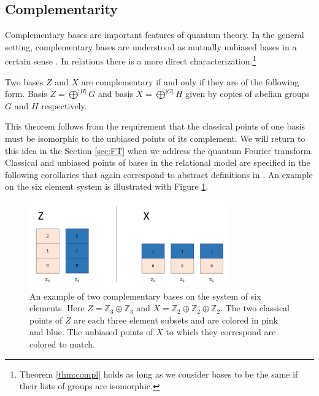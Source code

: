 \subsection{Complementarity}
Complementary bases are important features of quantum theory. In the general setting, complementary bases are understood as mutually unbiased bases in a certain sense \cite{InteractQOb}.  In relations there is a more direct characterization:\footnote{Theorem \ref{thm:compl} holds as long as we consider bases to be the same if their lists of groups are isomorphic.}
\begin{theorem}
\label{thm:compl}
Two bases $Z$ and $X$ are complementary if and only if they are of the following form. Basis $Z = \bigoplus^{|H|}G$ and basis $X = \bigoplus^{|G|}H$ given by copies of abelian groups $G$ and $H$ respectively.
\end{theorem}

This theorem follows from the requirement that the classical points of one basis must be isomorphic to the unbiased points of its complement. We will return to this idea in the Section \ref{sec:FT} when we address the quantum Fourier transform. Classical and unbiased points of bases in the relational model are specified in the following corollaries that again correspond to abstract definitions in \cite{InteractQOb}. An example on the six element system is illustrated with Figure \ref{complEx}.

\begin{figure}[tb]
\begin{center}
\includegraphics[height=10em,natwidth=1091,natheight=468,scale=1]{images/complexample.png}
\end{center}
\vspace{-14pt}
\caption{An example of two complementary bases on the system of six elements. Here $Z=\mathbb{Z}_3\oplus\mathbb{Z}_3$ and $X = \mathbb{Z}_2\oplus\mathbb{Z}_2\oplus \mathbb{Z}_2$.  The two classical points of $Z$ are each three element subsets and are colored in pink and blue. The unbiased points of $X$ to which they correspond are colored to match.
}
\label{complEx}
\end{figure}

